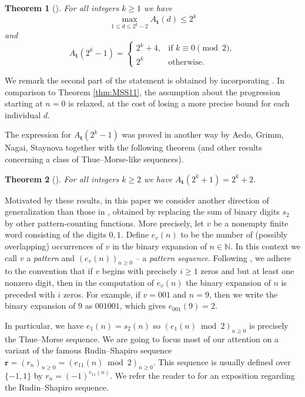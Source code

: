 \documentclass[a4paper,11pt]{amsart}
\newtheorem{thm}{Theorem}[section]
\theoremstyle{definition}
\newcommand{\N}{\mathbb{N}}
\begin{document}
\begin{thm}[\cite{Par17}] \label{thm:Par17}
For all integers $k \geq 1$ we have
$$  \max_{1 \leq d \leq 2^k-2} A_{\mathbf{t}}(d)  \leq  2^k$$
and
$$   A_{\mathbf{t}}(2^k-1) =  \begin{cases}
2^k + 4, &\text{if } k \equiv 0 \pmod{2},\\
2^k &\text{otherwise}.
\end{cases} $$
\end{thm}

We remark the second part of the statement is obtained by incorporating \cite[Lemma 1]{Par17}.
In comparison to Theorem \ref{thm:MSS11}, the assumption about the progression starting at $n = 0$ is relaxed, at the cost of losing a more precise bound for each individual $d$.

The expression for $A_{\mathbf{t}}(2^k-1)$ was proved in another way by Aedo, Grimm, Nagai, Staynova \cite{AGNS22} together with the following theorem (and other results concerning a class of Thue--Morse-like sequences).

\begin{thm}[\cite{AGNS22}] \label{thm:AGNS22}
For all integers $k \geq 2$ we have $A_{\mathbf{t}}(2^k+1) = 2^k+2$.
\end{thm}

Motivated by these results, in this paper we consider another direction of generalization than those in \cite{Par17,AGNS22}, obtained by replacing the sum of binary digits $s_2$ by other pattern-counting functions. More precisely, let $v$ be a nonempty finite word consisting of the digits $0,1$. Define $e_v(n)$ to be the number of (possibly overlapping) occurrences of $v$ in the binary expansion of $n \in \N$. In this context we call $v$ a \emph{pattern} and $(e_v(n))_{n \geq 0}$ -- a \emph{pattern sequence}. Following \cite[p.\ 78]{AS03}, we adhere to the convention that if $v$ begins with precisely $i \geq 1$ zeros and but at least one nonzero digit, then in the computation of $e_v(n)$ the binary expansion of $n$ is preceded with $i$ zeros. For example, if $v=001$ and $n=9$, then we write the binary expansion of $9$ as $001001$, which gives $e_{001}(9) = 2$.
 
In particular, we have $e_1(n) = s_2(n)$ so $(e_1(n) \bmod 2)_{n \geq 0}$ is precisely the Thue--Morse sequence. We are going to focus most of our attention on a variant of the famous Rudin--Shapiro sequence $\mathbf{r} = (r_n)_{n \geq 0} = (e_{11}(n) \bmod{2})_{n \geq 0}$. This sequence is usually defined over $\{-1,1\}$ by $r_n = (-1)^{e_{11}(n)}$. We refer the reader to \cite{AS03} for an exposition regarding the Rudin--Shapiro sequence.
\end{document}
